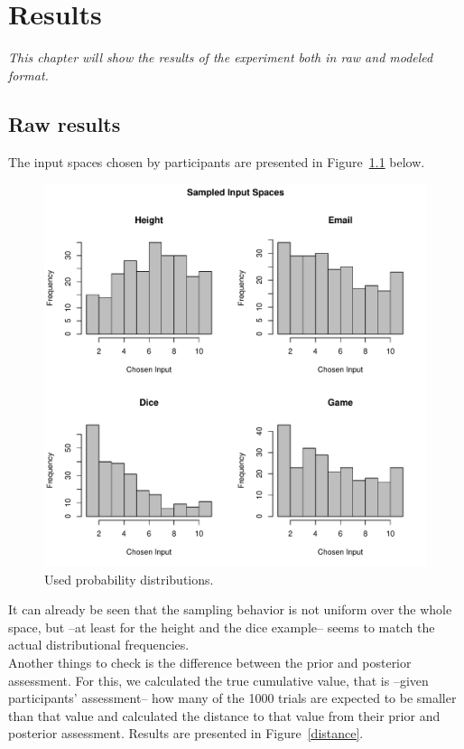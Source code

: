 \documentclass[oneside, 11pt]{book}
\begin{document}
\chapter{Results}
\emph{This chapter will show the results of the experiment both in raw and modeled format.}
\section{Raw results}
The input spaces chosen by participants are presented in Figure~\ref{raw} below.
\begin{figure}[h!]
\caption{Used probability distributions.}
\label{raw}
  \centering
    \includegraphics[scale=0.68]{rawsample.pdf}
\end{figure}
It can already be seen that the sampling behavior is not uniform over the whole space, but --at least for the height and the dice example-- seems to match the actual distributional frequencies.\\
Another things to check is the difference between the prior and posterior assessment.  For this, we calculated the true cumulative value, that is --given participants' assessment-- how many of the 1000 trials are expected to be smaller than that value and calculated the distance to that value from their prior and posterior assessment. Results are presented in Figure~\ref{distance}.
\end{document}
